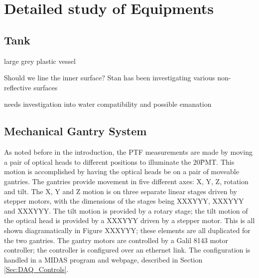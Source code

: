 \section{Detailed study of Equipments}





\subsection{Tank}



large grey plastic vessel

Should we line the inner surface? Stan has been investigating various
non-reflective surfaces

needs investigation into water compatibility and possible emanation





\subsection{Mechanical Gantry System}


As noted before in the introduction, the PTF measurements are made by moving a pair of optical heads to
different positions to illuminate the 20\" PMT.  This motion is accomplished by having the optical heads be on
a pair of moveable gantries.  The gantries provide movement in five different axes: X, Y, Z, rotation and tilt.
The X, Y and Z motion is on three separate linear stages driven by stepper motors,
with the dimensions of the stages being XXXYYY, XXXYYY
and XXXYYY.  The tilt motion is provided by a rotary stage; the tilt motion of the optical head is
provided by a XXXYYY driven by a stepper motor.
This is all shown diagramatically in Figure XXXYYY; these elements are all duplicated for
the two gantries.  The gantry motors are controlled by a Galil 8143 motor controller; the controller is configured
over an ethernet link.  The configuration is handled in a MIDAS program and webpage, described in Section
\ref{Sec:DAQ_Controls}.

